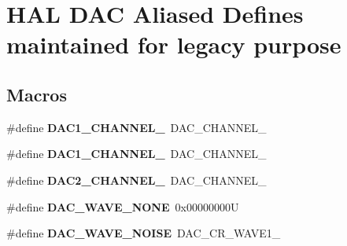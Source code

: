 \hypertarget{group___h_a_l___d_a_c___aliased___defines}{}\section{H\+AL D\+AC Aliased Defines maintained for legacy purpose}
\label{group___h_a_l___d_a_c___aliased___defines}
\subsection*{Macros}
\begin{DoxyCompactItemize}
\item 
\mbox{\label{group___h_a_l___d_a_c___aliased___defines_gacd0eabd250f1026912b0e3f7deecb2e7}} 
\#define {\bfseries D\+A\+C1\+\_\+\+C\+H\+A\+N\+N\+E\+L\+\_}~D\+A\+C\+\_\+\+C\+H\+A\+N\+N\+E\+L\+\_
\item 
\mbox{\label{group___h_a_l___d_a_c___aliased___defines_ga6358f0c4cfc9a0e67a739bf6cf17870c}} 
\#define {\bfseries D\+A\+C1\+\_\+\+C\+H\+A\+N\+N\+E\+L\+\_}~D\+A\+C\+\_\+\+C\+H\+A\+N\+N\+E\+L\+\_
\item 
\mbox{\label{group___h_a_l___d_a_c___aliased___defines_ga8d40044bd0865cdb12fea604852f2582}} 
\#define {\bfseries D\+A\+C2\+\_\+\+C\+H\+A\+N\+N\+E\+L\+\_}~D\+A\+C\+\_\+\+C\+H\+A\+N\+N\+E\+L\+\_
\item 
\mbox{\label{group___h_a_l___d_a_c___aliased___defines_ga7e80010819867e162e936510093a4cef}} 
\#define {\bfseries D\+A\+C\+\_\+\+W\+A\+V\+E\+\_\+\+N\+O\+NE}~0x00000000U
\item 
\mbox{\label{group___h_a_l___d_a_c___aliased___defines_ga4585a41ff6dfd14971119283f1d8045b}} 
\#define {\bfseries D\+A\+C\+\_\+\+W\+A\+V\+E\+\_\+\+N\+O\+I\+SE}~D\+A\+C\+\_\+\+C\+R\+\_\+\+W\+A\+V\+E1\+\_
\item 
\mbox{\label{group___h_a_l___d_a_c___aliased___defines_ga8340be3743135476cb33a7daf7e6ace5}} 

\end{DoxyCompactItemize}
